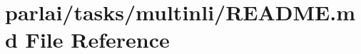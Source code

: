 \hypertarget{parlai_2tasks_2multinli_2README_8md}{}\section{parlai/tasks/multinli/\+R\+E\+A\+D\+ME.md File Reference}
\label{parlai_2tasks_2multinli_2README_8md}
